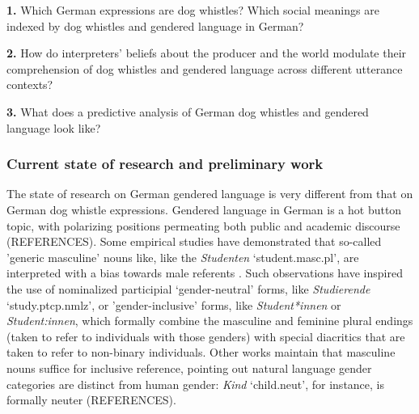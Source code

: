 \documentclass[11pt]{article}
\begin{document}
{\bf 1.} Which German expressions are dog whistles? Which social meanings are indexed by dog whistles and gendered language in German?

{\bf 2.} How do interpreters' beliefs about the producer and the world modulate their comprehension of dog whistles and gendered language across different utterance contexts? 

{\bf 3.} What does a predictive analysis of German dog whistles and gendered language look like? 

\subsubsection{Current state of research and preliminary work}



The state of research on German gendered language is very different from that on German dog whistle expressions. Gendered language in German is a hot button topic, with polarizing positions permeating both public and academic discourse (REFERENCES). Some empirical studies have demonstrated that so-called 'generic masculine' nouns like, like the {\em Studenten} `student.{\sc masc}.{\sc pl}', are interpreted with a bias towards male referents \parencite[e.g.,][]{GygaxEtAl2008, Kusterle2011}. Such observations have inspired the use of nominalized participial `gender-neutral' forms, like {\em Studierende} `study.{\sc ptcp}.{\sc nmlz}', or 'gender-inclusive' forms, like {\em Student*innen} or {\em Student:innen}, which formally combine the masculine and feminine plural endings (taken to refer to individuals with those genders) with special diacritics that are taken to refer to non-binary individuals. Other works maintain that masculine nouns suffice for inclusive reference, pointing out natural language gender categories are distinct from human gender: {\em Kind} `child.{\sc neut}', for instance, is formally neuter (REFERENCES).
\end{document}
